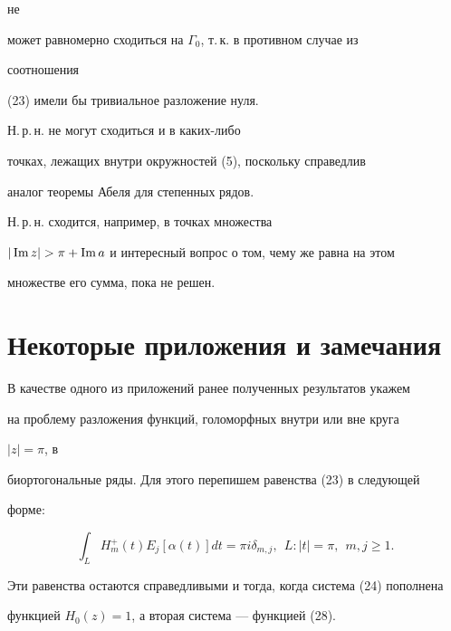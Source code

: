 не 


может равномерно сходиться на $\Gamma_0$, т.\,к. в противном случае из 


соотношения 


(23) имели бы тривиальное разложение нуля. 


Н.\,р.\,н. не могут сходиться и в каких-либо 


точках, лежащих внутри окружностей (5), поскольку справедлив  


аналог теоремы Абеля для степенных рядов.  


 


\begin{note} 


Н.\,р.\,н. сходится, например, в точках множества  


$|\im z|>\pi+\im a$ и интересный вопрос о том, чему же равна на этом


множестве его сумма, пока не решен. 


\end{note} 


 


\section{Некоторые приложения и замечания} 


 


В качестве одного из приложений ранее полученных результатов укажем 


на проблему разложения функций, голоморфных внутри или вне круга 


$|z|=\pi$, в 


биортогональные ряды. Для этого перепишем равенства (23) в следующей  


форме: 


\begin{equation} 


\int_L H^+_m(t)E_j[\alpha(t)]d t=\pi i\delta_{m,j}, 


\ \ L:|t|=\pi,\ \ m,j\ge1. 


\end{equation} 


Эти равенства остаются справедливыми и тогда, когда система (24) пополнена  


функцией $H_0(z)=1$, а вторая система --- функцией (28). 


